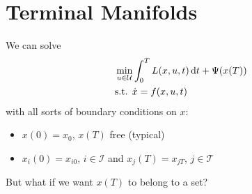 
\section{Terminal Manifolds}

We can solve
\begin{align}
  & \min_{u\in\mathcal U} \int_0^T L(x,u,t)\mathop{}\!\mathrm{d} t + \Psi(x(T)) \\
  & \text{s.t. } \dot x = f(x,u,t)
\end{align}
with all sorts of boundary conditions on $x$:
\begin{itemize}
\item $x(0)=x_0$, $x(T)$ free (typical)
\item $x_i(0)=x_{i0}$, $i\in\mathcal I$ and $x_j(T)=x_{jT}$, $j\in\mathcal T$
\end{itemize}
But what if we want $x(T)$ to belong to a set?

\begin{center}
\end{center}

